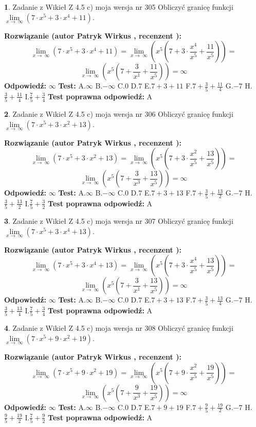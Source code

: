 \documentclass[12pt, a4paper]{article}
\theoremstyle{definition} %
\newtheorem{zad}{}
\newcommand{\zadStart}[1]{\begin{zad}#1\newline}
\newcommand{\zadStop}{\end{zad}}
\newcommand{\rozwStart}[2]{\noindent \textbf{Rozwiązanie (autor #1 , recenzent #2): }\newline}
\newcommand{\rozwStop}{\newline}
\newcommand{\odpStart}{\noindent \textbf{Odpowiedź:}\newline}
\newcommand{\odpStop}{\newline}
\newcommand{\testStart}{\noindent \textbf{Test:}\newline}
\newcommand{\testStop}{\newline}
\newcommand{\kluczStart}{\noindent \textbf{Test poprawna odpowiedź:}\newline}
\newcommand{\kluczStop}{\newline}
\begin{document}
\zadStart{Zadanie z Wikieł Z 4.5 c) moja wersja nr 305}
Obliczyć granicę funkcji  $\lim\limits_{x\to\ \infty}(7 \cdot x^{5}+3 \cdot x^{4}+11)$.
\zadStop
\rozwStart{Patryk Wirkus}{}
$$\lim\limits_{x\to\ \infty}(7 \cdot x^{5}+3 \cdot x^{4}+11) = \lim\limits_{x\to\ \infty}(x^{5}(7 +3 \cdot \frac{x^{4}}{x^{5}}+\frac{11}{x^{5}})) =$$ $$\lim\limits_{x\to\ \infty}(x^{5}(7 +\frac{3}{x^{1}}+\frac{11}{x^{5}})) =\infty$$
\rozwStop
\odpStart
$\infty$
\odpStop
\testStart
A.$\infty$ B.$-\infty$ C.$0$ D.$7$ E.$7 + 3 + 11$
F.$7+\frac{3}{5}+\frac{11}{4}$ G.$-7$
H.$\frac{3}{5}+\frac{11}{4}$
I.$\frac{7}{5}+\frac{3}{4}$
\testStop
\kluczStart
A
\kluczStop



\zadStart{Zadanie z Wikieł Z 4.5 c) moja wersja nr 306}
Obliczyć granicę funkcji  $\lim\limits_{x\to\ \infty}(7 \cdot x^{5}+3 \cdot x^{2}+13)$.
\zadStop
\rozwStart{Patryk Wirkus}{}
$$\lim\limits_{x\to\ \infty}(7 \cdot x^{5}+3 \cdot x^{2}+13) = \lim\limits_{x\to\ \infty}(x^{5}(7 +3 \cdot \frac{x^{2}}{x^{5}}+\frac{13}{x^{5}})) =$$ $$\lim\limits_{x\to\ \infty}(x^{5}(7 +\frac{3}{x^{3}}+\frac{13}{x^{5}})) =\infty$$
\rozwStop
\odpStart
$\infty$
\odpStop
\testStart
A.$\infty$ B.$-\infty$ C.$0$ D.$7$ E.$7 + 3 + 13$
F.$7+\frac{3}{5}+\frac{13}{2}$ G.$-7$
H.$\frac{3}{5}+\frac{13}{2}$
I.$\frac{7}{5}+\frac{3}{2}$
\testStop
\kluczStart
A
\kluczStop



\zadStart{Zadanie z Wikieł Z 4.5 c) moja wersja nr 307}
Obliczyć granicę funkcji  $\lim\limits_{x\to\ \infty}(7 \cdot x^{5}+3 \cdot x^{4}+13)$.
\zadStop
\rozwStart{Patryk Wirkus}{}
$$\lim\limits_{x\to\ \infty}(7 \cdot x^{5}+3 \cdot x^{4}+13) = \lim\limits_{x\to\ \infty}(x^{5}(7 +3 \cdot \frac{x^{4}}{x^{5}}+\frac{13}{x^{5}})) =$$ $$\lim\limits_{x\to\ \infty}(x^{5}(7 +\frac{3}{x^{1}}+\frac{13}{x^{5}})) =\infty$$
\rozwStop
\odpStart
$\infty$
\odpStop
\testStart
A.$\infty$ B.$-\infty$ C.$0$ D.$7$ E.$7 + 3 + 13$
F.$7+\frac{3}{5}+\frac{13}{4}$ G.$-7$
H.$\frac{3}{5}+\frac{13}{4}$
I.$\frac{7}{5}+\frac{3}{4}$
\testStop
\kluczStart
A
\kluczStop



\zadStart{Zadanie z Wikieł Z 4.5 c) moja wersja nr 308}
Obliczyć granicę funkcji  $\lim\limits_{x\to\ \infty}(7 \cdot x^{5}+9 \cdot x^{2}+19)$.
\zadStop
\rozwStart{Patryk Wirkus}{}
$$\lim\limits_{x\to\ \infty}(7 \cdot x^{5}+9 \cdot x^{2}+19) = \lim\limits_{x\to\ \infty}(x^{5}(7 +9 \cdot \frac{x^{2}}{x^{5}}+\frac{19}{x^{5}})) =$$ $$\lim\limits_{x\to\ \infty}(x^{5}(7 +\frac{9}{x^{3}}+\frac{19}{x^{5}})) =\infty$$
\rozwStop
\odpStart
$\infty$
\odpStop
\testStart
A.$\infty$ B.$-\infty$ C.$0$ D.$7$ E.$7 + 9 + 19$
F.$7+\frac{9}{5}+\frac{19}{2}$ G.$-7$
H.$\frac{9}{5}+\frac{19}{2}$
I.$\frac{7}{5}+\frac{9}{2}$
\testStop
\kluczStart
A
\kluczStop
\end{document}
